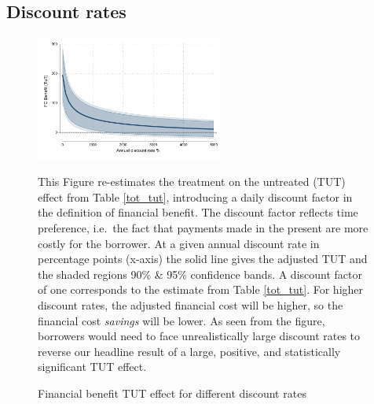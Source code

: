 \subsection{Discount rates}


\begin{figure}[H]
        \caption{Financial benefit TUT effect for different discount rates}
    \label{fc_discount_rates}
    \begin{center}
        \centering
        \includegraphics[width=0.55\textwidth]{Figuras/discount_effect_tut.pdf}
    \end{center}
     \scriptsize This Figure re-estimates the treatment on the untreated (TUT) effect from Table \ref{tot_tut}, introducing a daily discount factor in the definition of financial benefit. The discount factor reflects time preference, i.e.\ the fact that payments made in the present are more costly for the borrower. At a given annual discount rate in percentage points (x-axis) the solid line gives the adjusted TUT and the shaded regions 90\% \& 95\% confidence bands. A discount factor of one corresponds to the estimate from Table \ref{tot_tut}. For higher discount rates, the adjusted financial cost will be higher, so the financial cost \emph{savings} will be lower. As seen from the figure, borrowers would need to face unrealistically large discount rates to reverse our headline result of a large, positive, and statistically significant TUT effect.
\end{figure}





